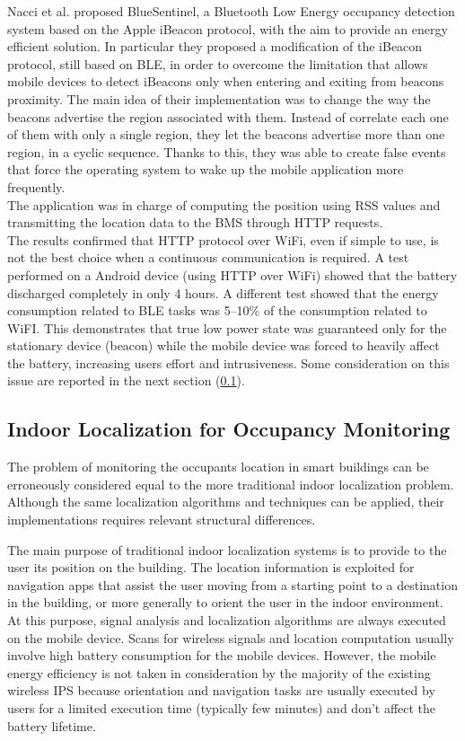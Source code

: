 Nacci et al. \cite{Conte2014} proposed BlueSentinel, a Bluetooth Low Energy occupancy detection system based on the Apple iBeacon protocol, with the aim to provide an energy efficient solution. In particular they proposed a modification of the iBeacon protocol, still based on BLE, in order to overcome the limitation that allows mobile devices to detect iBeacons only when entering and exiting from beacons proximity. The main idea of their implementation was to change the way the beacons advertise the region associated with them. Instead of correlate each one of them with only a single region, they let the beacons advertise more than one region, in a cyclic sequence. Thanks to this, they was able to create false events that force the operating system to wake up the mobile application more frequently.\\
The application was in charge of computing the position using RSS values and transmitting the location data to the BMS through HTTP requests.\\
The results confirmed that HTTP protocol over WiFi, even if simple to use, is not the best choice when a continuous communication is required. A test performed on a Android device (using HTTP over WiFi) showed that the battery discharged completely in only 4 hours. A different test showed that the energy consumption related to BLE tasks was \numrange{5}{10}\% of the consumption related to WiFI. This demonstrates that true low power state was guaranteed only for the stationary device (beacon) while the mobile device was forced to heavily affect the battery, increasing users effort and intrusiveness. Some consideration on this issue are reported in the next section (\ref{subsec:wips_od}).

\subsection{Indoor Localization for Occupancy Monitoring}
\label{subsec:wips_od}
The problem of monitoring the occupants location in smart buildings can be erroneously considered equal to the more traditional indoor localization problem. Although the same localization algorithms and techniques can be applied, their implementations requires relevant structural differences.

\smallskip
The main purpose of traditional indoor localization systems is to provide to the user its position on the building. The location information is exploited for navigation apps that assist the user moving from a starting point to a destination in the building, or more generally to orient the user in the indoor environment. At this purpose, signal analysis and localization algorithms are always executed on the mobile device.
Scans for wireless signals and location computation usually involve high battery consumption for the mobile devices. However, the mobile energy efficiency is not taken in consideration by the majority of the existing wireless IPS because orientation and navigation tasks are usually executed by users for a limited execution time (typically few minutes) and don't affect the battery lifetime.

